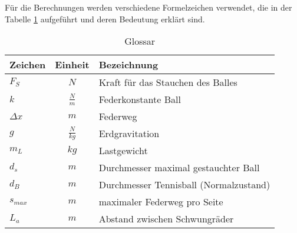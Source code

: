 Für die Berechnungen werden verschiedene Formelzeichen verwendet, die in 
der Tabelle \ref{tab:glossar} aufgeführt und deren Bedeutung erklärt sind.
\begin{table}[h!]
    \begin{tabular}{lcl}
        \rule{0pt}{11pt}Zeichen & Einheit & Bezeichnung \\
        \hline\rule{0pt}{11pt}$F_S$ & $N$ & Kraft für das Stauchen des Balles \\
        \rule{0pt}{11pt}$k$ & $\frac{N}{m}$ & Federkonstante Ball \\
        \rule{0pt}{11pt}$\Delta x$ & $m$ & Federweg \\
        \rule{0pt}{11pt}$g$ & $\frac{N}{kg}$ & Erdgravitation \\
        \rule{0pt}{11pt}$m_L$ & $kg$ & Lastgewicht \\
        \rule{0pt}{11pt}$d_s$ & $m$ & Durchmesser maximal gestauchter Ball \\
        \rule{0pt}{11pt}$d_B$ & $m$ & Durchmesser Tennisball (Normalzustand) \\
        \rule{0pt}{11pt}$s_{max}$ & $m$ & maximaler Federweg pro Seite \\
        \rule{0pt}{11pt}$L_a$ & $m$ & Abstand zwischen Schwungräder \\
    \end{tabular}
    	\centering
    	\caption{Glossar}
    	\label{tab:glossar}
\end{table}